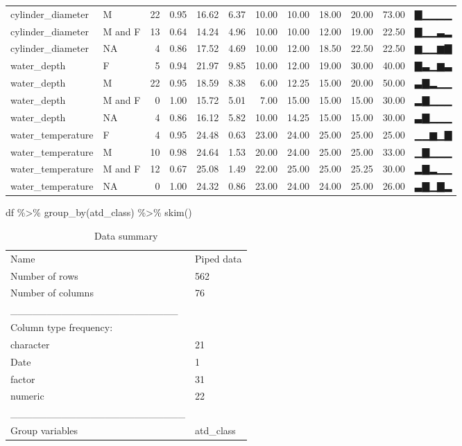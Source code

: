 \documentclass[
]{article}
\newenvironment{Shaded}{\begin{snugshade}}{\end{snugshade}}
\newcommand{\FunctionTok}[1]{\textcolor[rgb]{0.00,0.00,0.00}{#1}}
\newcommand{\NormalTok}[1]{#1}
\newcommand{\SpecialCharTok}[1]{\textcolor[rgb]{0.00,0.00,0.00}{#1}}
\begin{document}
\begin{longtable}[]{@{}llrrrrrrrrrl@{}}
cylinder\_diameter & M & 22 & 0.95 & 16.62 & 6.37 & 10.00 & 10.00 &
18.00 & 20.00 & 73.00 & ▇▁▁▁▁ \\
cylinder\_diameter & M and F & 13 & 0.64 & 14.24 & 4.96 & 10.00 & 10.00
& 12.00 & 19.00 & 22.50 & ▇▁▁▃▂ \\
cylinder\_diameter & NA & 4 & 0.86 & 17.52 & 4.69 & 10.00 & 12.00 &
18.50 & 22.50 & 22.50 & ▆▁▁▆▇ \\
water\_depth & F & 5 & 0.94 & 21.97 & 9.85 & 10.00 & 12.00 & 19.00 &
30.00 & 40.00 & ▇▃▁▆▃ \\
water\_depth & M & 22 & 0.95 & 18.59 & 8.38 & 6.00 & 12.25 & 15.00 &
20.00 & 50.00 & ▃▇▂▁▁ \\
water\_depth & M and F & 0 & 1.00 & 15.72 & 5.01 & 7.00 & 15.00 & 15.00
& 15.00 & 30.00 & ▂▇▁▁▁ \\
water\_depth & NA & 4 & 0.86 & 16.12 & 5.82 & 10.00 & 14.25 & 15.00 &
15.00 & 30.00 & ▃▇▁▁▁ \\
water\_temperature & F & 4 & 0.95 & 24.48 & 0.63 & 23.00 & 24.00 & 25.00
& 25.00 & 25.00 & ▁▁▆▁▇ \\
water\_temperature & M & 10 & 0.98 & 24.64 & 1.53 & 20.00 & 24.00 &
25.00 & 25.00 & 33.00 & ▁▇▁▁▁ \\
water\_temperature & M and F & 12 & 0.67 & 25.08 & 1.49 & 22.00 & 25.00
& 25.00 & 25.25 & 30.00 & ▂▇▂▁▁ \\
water\_temperature & NA & 0 & 1.00 & 24.32 & 0.86 & 23.00 & 24.00 &
24.00 & 25.00 & 26.00 & ▃▇▁▇▂ \\
\bottomrule
\end{longtable}

\begin{Shaded}
\begin{Highlighting}[]
\NormalTok{df }\SpecialCharTok{\%\textgreater{}\%} 
  \FunctionTok{group\_by}\NormalTok{(atd\_class) }\SpecialCharTok{\%\textgreater{}\%} 
  \FunctionTok{skim}\NormalTok{()}
\end{Highlighting}
\end{Shaded}

\begin{longtable}[]{@{}ll@{}}
\caption{Data summary}\tabularnewline
\toprule
\endhead
Name & Piped data \\
Number of rows & 562 \\
Number of columns & 76 \\
\_\_\_\_\_\_\_\_\_\_\_\_\_\_\_\_\_\_\_\_\_\_\_ & \\
Column type frequency: & \\
character & 21 \\
Date & 1 \\
factor & 31 \\
numeric & 22 \\
\_\_\_\_\_\_\_\_\_\_\_\_\_\_\_\_\_\_\_\_\_\_\_\_ & \\
Group variables & atd\_class \\
\bottomrule
\end{longtable}
\end{document}

